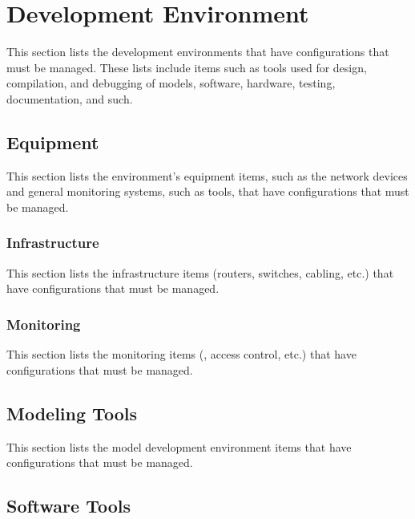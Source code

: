 
\section{Development Environment}
\label{loc:CI_Environment}

This section lists the development environments that have configurations that must be managed.
These lists include items such as tools used for design, compilation, and debugging of \MBSE models, software, hardware, testing, documentation, and such.

\subsection{Equipment}
\label{loc:CI_Dev_Equipment}

This section lists the environment's equipment items, such as the network devices and general monitoring systems, such as \SIEM tools, that have configurations that must be managed.

\subsubsection{Infrastructure}
\label{loc:CI_Dev_Infrastructure}

This section lists the infrastructure items (routers, switches, cabling, etc.) that have configurations that must be managed.

\subsubsection{Monitoring}
\label{loc:CI_Dev_Monitoring}

This section lists the monitoring items (\SIEM, access control, etc.) that have configurations that must be managed.


\subsection{Modeling Tools}
\label{loc:CI_Dev_Modeling}

This section lists the model development environment items that have configurations that must be managed.

\subsection{Software Tools}
\label{loc:CI_Dev_Software}

